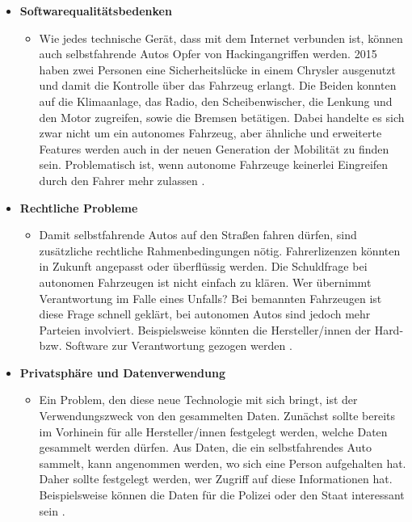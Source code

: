 \documentclass{sigchi}
\begin{document}
\begin{itemize}
    \item \textbf{Softwarequalitätsbedenken}
        \begin{itemize}
            \item Wie jedes technische Gerät, dass mit dem Internet verbunden ist, können auch selbstfahrende Autos Opfer von Hackingangriffen werden. 2015 haben zwei Personen eine Sicherheitslücke in einem Chrysler ausgenutzt und damit die Kontrolle über das Fahrzeug erlangt. Die Beiden konnten auf die Klimaanlage, das Radio, den Scheibenwischer, die Lenkung und den Motor zugreifen, sowie die Bremsen betätigen. Dabei handelte es sich zwar nicht um ein autonomes Fahrzeug, aber ähnliche und erweiterte Features werden auch in der neuen Generation der Mobilität zu finden sein. Problematisch ist, wenn autonome Fahrzeuge keinerlei Eingreifen durch den Fahrer mehr zulassen \cite{privacy-and-security-issues:2019}.
    \end{itemize}
    \item \textbf{Rechtliche Probleme}
        \begin{itemize}
            \item Damit selbstfahrende Autos auf den Straßen fahren dürfen, sind zusätzliche rechtliche Rahmenbedingungen nötig. Fahrerlizenzen könnten in Zukunft angepasst oder überflüssig werden. Die Schuldfrage bei autonomen Fahrzeugen ist nicht einfach zu klären. Wer übernimmt Verantwortung im Falle eines Unfalls? Bei bemannten Fahrzeugen ist diese Frage schnell geklärt, bei autonomen Autos sind jedoch mehr Parteien involviert. Beispielsweise könnten die Hersteller/innen der Hard- bzw. Software zur Verantwortung gezogen werden \cite{itf:2015}.
        \end{itemize}
    \item \textbf{Privatsphäre und Datenverwendung}
        \begin{itemize}
            \item Ein Problem, den diese neue Technologie mit sich bringt, ist der Verwendungszweck von den gesammelten Daten. Zunächst sollte bereits im Vorhinein für alle Hersteller/innen festgelegt werden, welche Daten gesammelt werden dürfen. Aus Daten, die ein selbstfahrendes Auto sammelt, kann angenommen werden, wo sich eine Person aufgehalten hat. Daher sollte festgelegt werden, wer Zugriff auf diese Informationen hat. Beispielsweise können die Daten für die Polizei oder den Staat interessant sein \cite{glancy-privacy:2012}.
        \end{itemize}
\end{itemize}
\end{document}

